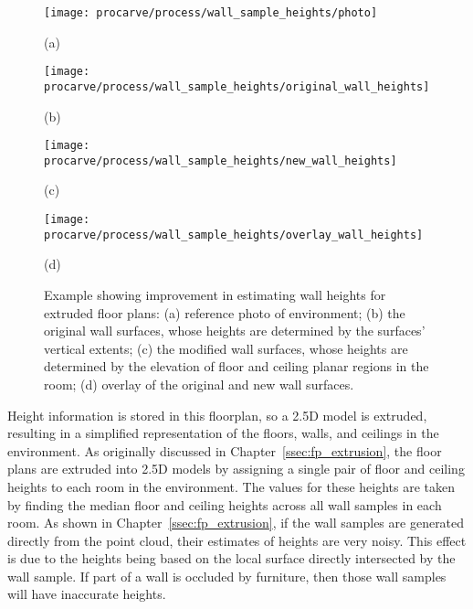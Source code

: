 \documentclass[12pt,onecolumn,oneside]{book}
\begin{document}
\begin{figure}

	\centering
	\begin{minipage}[t]{0.45\linewidth}
		\centerline{\texttt{[image: procarve/process/wall\_sample\_heights/photo]}}
		\centerline{(a)}
	\end{minipage}
	\hfill
	\begin{minipage}[t]{0.45\linewidth}
		\centerline{\texttt{[image: procarve/process/wall\_sample\_heights/original\_wall\_heights]}}
		\centerline{(b)}
	\end{minipage}
	
	\begin{minipage}[t]{0.45\linewidth}
		\centerline{\texttt{[image: procarve/process/wall\_sample\_heights/new\_wall\_heights]}}
		\centerline{(c)}
	\end{minipage}
	\hfill
	\begin{minipage}[t]{0.45\linewidth}
		\centerline{\texttt{[image: procarve/process/wall\_sample\_heights/overlay\_wall\_heights]}}
		\centerline{(d)}
	\end{minipage}

	\caption[Comparison of wall extrusion methods.]{Example showing improvement in estimating wall heights for extruded floor plans: (a) reference photo of environment; (b) the original wall surfaces, whose heights are determined by the surfaces' vertical extents; (c) the modified wall surfaces, whose heights are determined by the elevation of floor and ceiling planar regions in the room; (d) overlay of the original and new wall surfaces.}
	\label{fig:octree_wall_sample_heights}
\end{figure}

Height information is stored in this floorplan, so a 2.5D model is extruded, resulting in a simplified representation of the floors, walls, and ceilings in the environment.  As originally discussed in Chapter~\ref{ssec:fp_extrusion}, the floor plans are extruded into 2.5D models by assigning a single pair of floor and ceiling heights to each room in the environment.  The values for these heights are taken by finding the median floor and ceiling heights across all wall samples in each room.  As shown in Chapter~\ref{ssec:fp_extrusion}, if the wall samples are generated directly from the point cloud, their estimates of heights are very noisy.  This effect is due to the heights being based on the local surface directly intersected by the wall sample.  If part of a wall is occluded by furniture, then those wall samples will have inaccurate heights.
\end{document}
